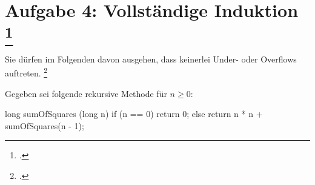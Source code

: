\documentclass{lehramt-informatik-aufgabe}
\begin{document}
\let\m=\liInduktionMarkierung
\let\e=\liInduktionErklaerung


\section{Aufgabe 4: Vollständige Induktion
\footcite{sosy:ab:8}
}

Sie dürfen im Folgenden davon ausgehen, dass keinerlei Under- oder
Overflows auftreten.
\footcite[Thema 1 Aufgabe 4]{examen:66115:2017:03}

\bigskip

\noindent
Gegeben sei folgende rekursive Methode für $n \geq 0$:

\begin{liJavaAngabe}
long sumOfSquares (long n) {
  if (n == 0)
    return 0;
  else
    return n * n + sumOfSquares(n - 1);
}
\end{liJavaAngabe}
\end{document}
